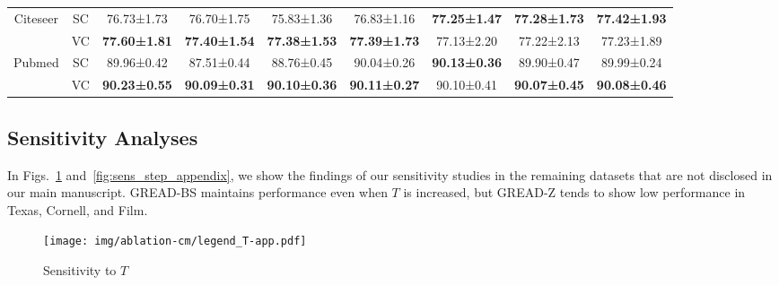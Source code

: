 \documentclass{article}
\theoremstyle{plain}
\theoremstyle{definition}
\theoremstyle{remark}
\newcommand{\std}{\scriptsize{}}
\begin{document}
\begin{table}[h!]
\begin{tabular}{cc cccc ccc}
        \midrule \multirow{2}{*}{Citeseer}
        & SC    &  76.73\std{±1.73} & 76.70\std{±1.75} & 75.83\std{±1.36} & 76.83\std{±1.16} & \textbf{77.25\std{±1.47}} & \textbf{77.28\std{±1.73}} & \textbf{77.42\std{±1.93}} \\
        & VC    &  \textbf{77.60\std{±1.81}} & \textbf{77.40\std{±1.54}} & \textbf{77.38\std{±1.53}} & \textbf{77.39\std{±1.73}} & 77.13\std{±2.20} & 77.22\std{±2.13} & 77.23\std{±1.89} \\ 
        \midrule \multirow{2}{*}{Pubmed}
        & SC    &  89.96\std{±0.42} & 87.51\std{±0.44} & 88.76\std{±0.45} & 90.04\std{±0.26} & \textbf{90.13\std{±0.36}} & 89.90\std{±0.47} & 89.99\std{±0.24} \\ 
        & VC    &  \textbf{90.23\std{±0.55}} & \textbf{90.09\std{±0.31}} & \textbf{90.10\std{±0.36}} & \textbf{90.11\std{±0.27}} & 90.10\std{±0.41} & \textbf{90.07\std{±0.45}} & \textbf{90.08\std{±0.46}} \\
        \bottomrule
     \end{tabular}
 \end{table}

\clearpage
 
\subsection{Sensitivity Analyses}\label{a:sensitivity}
In Figs.~\ref{fig:sens_T_appendix} and~\ref{fig:sens_step_appendix}, we show the findings of our sensitivity studies in the remaining datasets that are not disclosed in our main manuscript. GREAD-BS maintains performance even when $T$ is increased, but GREAD-Z tends to show low performance in Texas, Cornell, and Film.

 \begin{figure}[ht!]
    \centering
\texttt{[image: img/ablation-cm/legend\_T-app.pdf]}\vspace{0.3in}
    \caption{Sensitivity to $T$}
    \label{fig:sens_T_appendix}
\end{figure}
\end{document}
